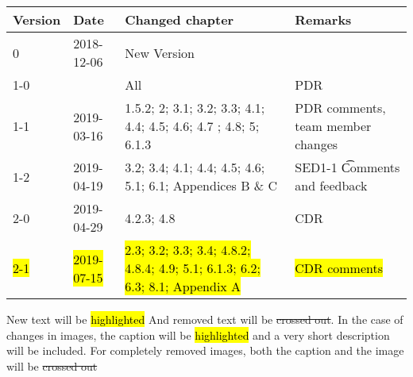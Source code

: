 \begin{longtable}{|p{1.5cm}|p{2cm}|p{6cm}|p{3cm}|}\hline
\centering
\textbf{Version} & \textbf{Date} & \textbf{Changed chapter} & \textbf{Remarks}  \\\hline
0       & 2018-12-06        & New Version                                                           &                                       \\\hline
1-0     &                   & All                                                                   & PDR                                   \\\hline
1-1     & 2019-03-16        & 1.5.2; 2; 3.1; 3.2; 3.3; 4.1; 4.4; 4.5; 4.6; 4.7 ; 4.8; 5; 6.1.3      & PDR comments, team member changes     \\\hline
1-2     & 2019-04-19        & 3.2; 3.4; 4.1; 4.4; 4.5; 4.6; 5.1; 6.1; Appendices B \& C             & SED1-1 \t Comments and feedback       \\\hline
2-0     & 2019-04-29        & 4.2.3; 4.8                                                            & CDR                                   \\\hline
\hl{2-1}& \hl{2019-07-15}   & \hl{2.3; 3.2; 3.3; 3.4; 4.8.2; 4.8.4; 4.9; 5.1; 6.1.3; 6.2; 6.3; 8.1; Appendix A}  & \hl{CDR comments} \\\hline

\end{longtable}       

New text will be \hl{highlighted} And removed text will be \st{crossed out}. In the case of changes in images, the caption will be \hl{highlighted} and a very short description will be included. For completely removed images, both the caption and the image will be \st{crossed out} 
